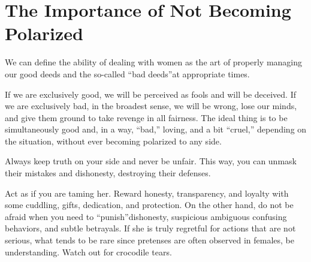 \section{The Importance of Not Becoming Polarized}

\par We can define the ability of dealing with women as the art of properly managing our good deeds and the so-called \enquote{bad deeds}\footnotemark[27] at appropriate times.


\par If we are exclusively good, we will be perceived as fools and will be deceived. If we are exclusively bad, in the broadest sense, we will be wrong, lose our minds, and give them ground to take revenge in all fairness. The ideal thing is to be simultaneously good and, in a way, \enquote{bad,} loving, and a bit \enquote{cruel,} depending on the situation, without ever becoming polarized to any side.

\par Always keep truth on your side and never be unfair. This way, you can unmask their mistakes and dishonesty, destroying their defenses.

\par Act as if you are taming her\footnotemark[28]. Reward honesty, transparency, and loyalty with some cuddling, gifts, dedication, and protection. On the other hand, do not be afraid when you need to \enquote{punish}\footnotemark[29] dishonesty, suspicious ambiguous confusing behaviors, and subtle betrayals. If she is truly regretful for actions that are not serious, what tends to be rare since pretenses are often observed in females, be understanding. Watch out for crocodile tears.

